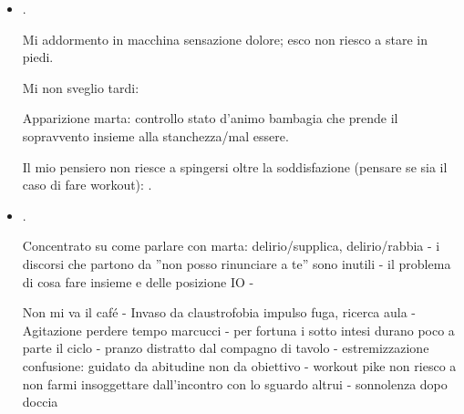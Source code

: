 \begin{itemize}
Cantare per 

: pacinotti chiuso? giornata di pioggia? funzioneranno le macchinette?

: convezione raggio $\alpha$.

A pranzo: ; non riesco a recitare ho .

Penso se sia il caso di prendere un caf\'e fino alle 16.10: lo prendo come sempre.

Incertezza nel seguire una strada; tendo a fare cose guidato dagli impulsi.

Workout - presenza di ragazza con cane induce riflesso per spalancatura cancello e ininisce nella liberazione.

Telefono madre dopo workout: non riesco a recitare: vuoto - non mi viene niente (abitudine: ).

A cena sono distratto dal panico loquor indotto da amici svedesi.

\item {}.

Mi addormento in macchina sensazione dolore; esco non riesco a stare in piedi.

Mi non sveglio tardi: 

Apparizione marta: controllo stato d'animo bambagia che prende il sopravvento insieme alla stanchezza/mal essere.

Il mio pensiero non riesce a spingersi oltre la soddisfazione (pensare se sia il caso di fare workout): .

\item {}.

Concentrato su come parlare con marta: delirio/supplica, delirio/rabbia - i discorsi che partono da ''non posso rinunciare a te'' sono inutili - il problema di cosa fare insieme e delle posizione IO -

Non mi va il caf\'e - Invaso da claustrofobia impulso fuga, ricerca aula - Agitazione perdere tempo marcucci - per fortuna i sotto intesi durano poco a parte il ciclo - pranzo distratto dal compagno di tavolo - estremizzazione confusione: guidato da abitudine non da obiettivo - workout pike non riesco a non farmi insoggettare dall'incontro con lo sguardo altrui - sonnolenza dopo doccia


\end{itemize}
